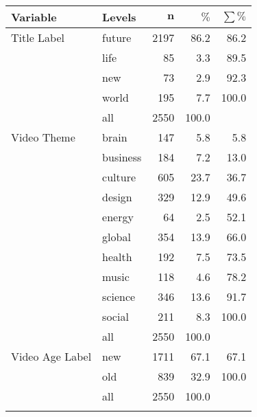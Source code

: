 \begingroup\footnotesize
\begin{longtable}{ll|rrr}
 \textbf{Variable} & \textbf{Levels} & $\mathbf{n}$ & $\mathbf{\%}$ & $\mathbf{\sum \%}$ \\ 
  \hline
Title Label & future & 2197 & 86.2 & 86.2 \\ 
   & life & 85 & 3.3 & 89.5 \\ 
   & new & 73 & 2.9 & 92.3 \\ 
   & world & 195 & 7.7 & 100.0 \\ 
   \hline
 & all & 2550 & 100.0 &  \\ 
   \hline
\hline
Video Theme & brain & 147 & 5.8 & 5.8 \\ 
   & business & 184 & 7.2 & 13.0 \\ 
   & culture & 605 & 23.7 & 36.7 \\ 
   & design & 329 & 12.9 & 49.6 \\ 
   & energy & 64 & 2.5 & 52.1 \\ 
   & global & 354 & 13.9 & 66.0 \\ 
   & health & 192 & 7.5 & 73.5 \\ 
   & music & 118 & 4.6 & 78.2 \\ 
   & science & 346 & 13.6 & 91.7 \\ 
   & social & 211 & 8.3 & 100.0 \\ 
   \hline
 & all & 2550 & 100.0 &  \\ 
   \hline
\hline
Video Age Label & new & 1711 & 67.1 & 67.1 \\ 
   & old & 839 & 32.9 & 100.0 \\ 
   \hline
 & all & 2550 & 100.0 &  \\ 
   \hline
\hline
\hline
\caption{} 
\label{}
\end{longtable}
\endgroup
